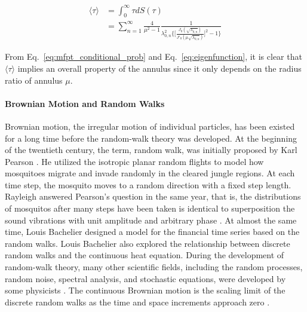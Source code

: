 \begin{equation}\label{eq:mfpt_conditional_prob}
  \begin{split}
    \langle \tau \rangle &= \int_{0}^{\infty} \tau dS(\tau)\\
    &=\sum_{n=1}^{\infty} \frac{4}{\mu^2 - 1}
    \frac{1}{\lambda^2_{0,n}\bigg\{\bigg[\frac{J_0(\sqrt{\lambda_{0,n}})}{J'_0(\mu\sqrt{\lambda_{0,n}})}\bigg]^2
      -1\bigg\}}
  \end{split}
\end{equation}


From Eq.~\ref{eq:mfpt_conditional_prob} and
Eq.~\ref{eq:eigenfunction}, it is clear that $\langle \tau \rangle$
implies an overall property of the annulus since it only depends on
the radius ratio of annulus $\mu$.


\paragraph{Brownian Motion and Random Walks}

Brownian motion, the irregular motion of individual particles, has
been existed for a long time before the random-walk theory was
developed. At the beginning of the twentieth century, the term, random
walk, was initially proposed by Karl
Pearson \cite{pearson1905problem}. He utilized the isotropic planar
random flights to model how mosquitoes migrate and invade randomly in
the cleared jungle regions. At each time step, the mosquito moves to a
random direction with a fixed step
length. Rayleigh \cite{rayleigh1905problem} answered Pearson's
question in the same year, that is, the distributions of mosquitos
after many steps have been taken is identical to superposition the
sound vibrations with unit amplitude and arbitrary
phase \cite{de2012flying}. At almost the same time, Louis
Bachelier \cite{bachelier1900theorie} designed a model for the
financial time series based on the random walks. Louis Bachelier also
explored the relationship between discrete random walks and the
continuous heat equation. During the development of random-walk
theory, many other scientific fields, including the random processes,
random noise, spectral analysis, and stochastic equations, were
developed by some
physicists \cite{einstein1905electrodynamics} \cite{einstein1906theory} \cite{smoluchowski1916drei}. The
continuous Brownian motion is the scaling limit of the discrete random
walks as the time and space increments approach
zero \cite{lawler2010random}\cite{varadhan1980lectures}.


